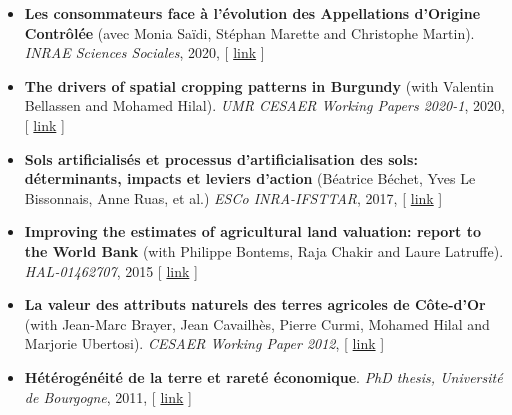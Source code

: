 \documentclass[11pt, a4paper]{./style}
\begin{document}
\label{sec:org01a9635}

\begin{itemize}
\item \textbf{Les consommateurs face à l’évolution des Appellations d’Origine
Contrôlée} (avec Monia Saïdi, Stéphan Marette and Christophe
Martin). \emph{INRAE Sciences Sociales}, 2020, [ \href{https://ageconsearch.umn.edu/record/305806}{link} ]
\item \textbf{The drivers of spatial cropping patterns in Burgundy} (with
Valentin Bellassen and Mohamed Hilal). \emph{UMR CESAER Working Papers
2020-1}, 2020, [ \href{https://hal.inrae.fr/hal-02894116}{link} ]
\item \textbf{Sols artificialisés et processus d'artificialisation des sols:
déterminants, impacts et leviers d'action} (Béatrice Béchet, Yves
Le Bissonnais, Anne Ruas, et al.) \emph{ESCo INRA-IFSTTAR}, 2017, [
\href{https://www.inrae.fr/actualites/sols-artificialises-processus-dartificialisation-sols}{link} ]
\item \textbf{Improving the estimates of agricultural land valuation: report
to the World Bank} (with Philippe Bontems, Raja Chakir and Laure
Latruffe). \emph{HAL-01462707}, 2015 [ \href{https://hal.archives-ouvertes.fr/hal-01462707}{link} ]
\item \textbf{La valeur des attributs naturels des terres agricoles de
Côte-d'Or} (with Jean-Marc Brayer, Jean Cavailhès, Pierre Curmi,
Mohamed Hilal and Marjorie Ubertosi). \emph{CESAER Working Paper
2012}, [ \href{http://ideas.repec.org/p/ceo/wpaper/33.html}{link} ]
\item \textbf{Hétérogénéité de la terre et rareté économique}. \emph{PhD thesis,
Université de Bourgogne}, 2011, [ \href{http://tel.archives-ouvertes.fr/tel-00629142/en/}{link} ]
\end{itemize}

\label{sec:orgbed9061}
\end{document}
